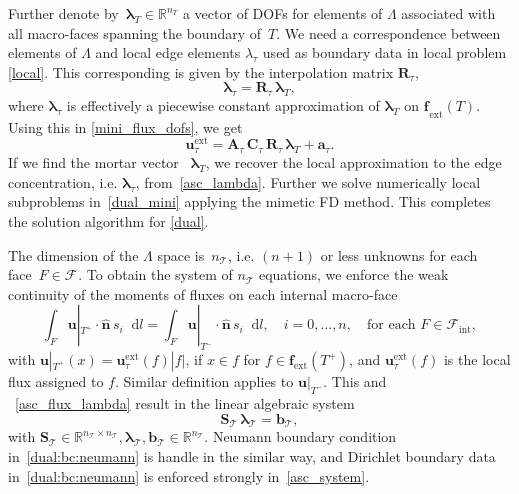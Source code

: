 \documentclass[12pt]{article}
\newcommand{\vect}[1]{\boldsymbol{\mathbf{#1}}}
\newcommand{\bcell}{T}
\newcommand{\bmesh}{{\vect{\mathcal T}}}
\newcommand{\mmesh}{{\vect{\mathcal \tau}}}
\newcommand{\bfaces}[1][]{{\vect{\mathcal F}_{\text{#1}}}}
\newcommand{\mfaces}[1][]{{\vect{ f}_{\text{#1}}}}
\newcommand{\Rn}[1]{{\mathbb R^{#1}}}
\newcommand*\diff{\mathop{}\!\mathrm{d}}
\begin{document}
Further denote by~${{\vect \lambda}_\bcell \in \Rn{n_\bcell}}$ a vector of DOFs for elements of $\Lambda$ associated with all macro-faces spanning the boundary of~$\bcell$. We need a correspondence between elements of $\Lambda$ and local edge elements $\lambda_\mmesh$ used as boundary data in local problem \eqref{local}.
This corresponding is given by the interpolation matrix $ \vect R_\mmesh$,
	\begin{equation}\label{asc_lambda}
		{\vect \lambda}_\mmesh = \vect R_\mmesh\,{\vect \lambda}_\bcell,
	\end{equation}
where ${\vect \lambda}_\mmesh$ is effectively a piecewise constant approximation of ${\vect \lambda}_\bcell$ on $\mfaces_{\text{ext}}(T)$.
Using this in \eqref{mini_flux_dofs}, we get
	\begin{equation}\label{asc_flux_lambda}
		{\vect u}^\text{ext}_\mmesh = \vect A_\mmesh\,\vect C_\mmesh\,\vect R_\mmesh\,{\vect \lambda}_\bcell + {\vect a}_\mmesh.
	\end{equation}
If we find the mortar vector ~${\vect \lambda}_\bcell$, we recover the local approximation to the edge concentration, i.e. ${\vect \lambda}_\mmesh$, from~\eqref{asc_lambda}.
Further we solve numerically local subproblems in~\eqref{dual_mini} applying the mimetic FD method. This completes the solution algorithm for \eqref{dual}.
	
	The dimension of the $\Lambda$ space is~$n_\bmesh$, i.e. $(n+1)$ or less unknowns for each face~${F \in \bfaces}$.
        To obtain the system of $n_\bmesh$ equations, we enforce the weak continuity of the moments of  fluxes  on each internal macro-face
	\begin{equation}\label{flux_cont}
		\int_F \vect u|_{\bcell^+}\cdot\hat{\vect n}\,s_i \diff l = \int_F \vect u|_{\bcell^-}\cdot\hat{\vect n}\,s_i \diff l, \quad i = 0, \dots, n, \quad \text{for each } F \in \bfaces[int],
	\end{equation}
with $\vect u|_{\bcell^+}(x)={\vect u}^\text{ext}_\mmesh(f)|f|$, if $x\in f$ for $f\in \mfaces[ext](\bcell^+)$, and ${\vect u}^\text{ext}_\mmesh(f)$ is the local flux assigned to $f$. Similar definition applies to $\vect u|_{\bcell^-}$. 	
This and ~\eqref{asc_flux_lambda} result in the linear algebraic system
	\begin{equation}\label{asc_system}
		\vect S_\bmesh\,{\vect \lambda}_\bmesh = {\vect b}_\bmesh,
	\end{equation}
with	$\vect S_\bmesh \in \Rn{n_\bmesh \times n_\bmesh}, {\vect \lambda}_\bmesh, {\vect b}_\bmesh \in \Rn{n_\bmesh}$.
Neumann boundary condition in~\eqref{dual:bc:neumann} is handle in the similar way, and Dirichlet boundary data in~\eqref{dual:bc:neumann} is enforced strongly in~\eqref{asc_system}.
	
\end{document}
